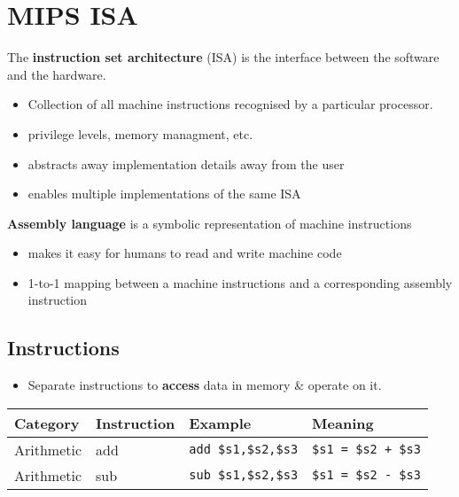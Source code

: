 \documentclass{article}
\newcommand{\T}[1]{\texttt{#1}}
\begin{document}
\section{MIPS ISA}
\begin{definition}
	The \textbf{instruction set architecture} (ISA) is the interface between
	the software and the hardware.
	\begin{itemize}
		\item Collection of all machine instructions recognised by
		      a particular processor.
		\item privilege levels, memory managment, etc.
		\item abstracts away implementation details away from the user
		\item enables multiple implementations of the same ISA
	\end{itemize}
\end{definition}
\begin{definition}
	\textbf{Assembly language} is a symbolic representation of machine instructions
	\begin{itemize}
		\item makes it easy for humans to read and write machine code
		\item 1-to-1 mapping between a machine instructions and a corresponding
		      assembly instruction
	\end{itemize}
\end{definition}
\subsection{Instructions}
\begin{itemize}
	\item Separate instructions to \textbf{access} data in memory \& operate on it.
\end{itemize}

\begin{tabular}{| l | l | l | l |}
	\hline
	Category   & Instruction & Example                & Meaning                \\
	\hline
	\hline
	Arithmetic & add         & \T{add \$s1,\$s2,\$s3} & \T{\$s1 = \$s2 + \$s3} \\
	\hline
	Arithmetic & sub         & \T{sub \$s1,\$s2,\$s3} & \T{\$s1 = \$s2 - \$s3} \\
	\hline
\end{tabular}
\end{document}
